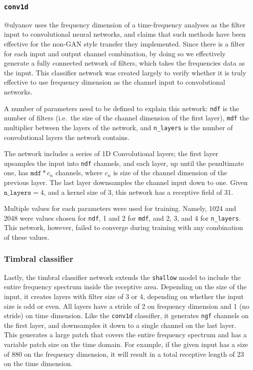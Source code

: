 \documentclass[12pt,a4paper,]{report}
\begin{document}
\hypertarget{conv1d}{%
\subsubsection{\texorpdfstring{\texttt{conv1d}}{conv1d}}\label{conv1d}}

@ulyanov uses the frequency dimension of a time-frequency analyses as
the filter input to convolutional neural networks, and claims that such
methods have been effective for the non-GAN style transfer they
implemented. Since there is a filter for each input and output channel
combination, by doing so we effectively generate a fully connected
network of filters, which takes the frequencies data as the input. This
classifier network was created largely to verify whether it is truly
effective to use frequency dimension as the channel input to
convolutional networks.

A number of parameters need to be defined to explain this network:
\texttt{ndf} is the number of filters (i.e.~the size of the channel
dimension of the first layer), \texttt{mdf} the multiplier between the
layers of the network, and \texttt{n\_layers} is the number of
convolutional layers the network contains.

The network includes a series of 1D Convolutional layers; the first
layer upsamples the input into \texttt{ndf} channels, and each layer, up
until the penultimate one, has \(\texttt{mdf} * c_n\) channels, where
\(c_n\) is size of the channel dimension of the previous layer. The last
layer downsamples the channel input down to one. Given
\(\texttt{n\_layers} = 4\), and a kernel size of 3, this network has a
receptive field of 31.

Multiple values for each parameters were used for training. Namely, 1024
and 2048 were values chosen for \texttt{ndf}, 1 and 2 for \texttt{mdf},
and 2, 3, and 4 for \texttt{n\_layers}. This network, however, failed to
converge during training with any combination of these values.

\hypertarget{timbral-classifier}{%
\subsubsection{Timbral classifier}\label{timbral-classifier}}

Lastly, the timbral classifier network extends the \texttt{shallow}
model to include the entire frequency spectrum inside the receptive
area. Depending on the size of the input, it creates layers with filter
size of 3 or 4, depending on whether the input size is odd or even. All
layers have a stride of 2 on frequency dimension and 1 (no stride) on
time dimension. Like the \texttt{conv1d} classifier, it generates
\texttt{ngf} channels on the first layer, and downsamples it down to a
single channel on the last layer. This generates a large patch that
covers the entire frequency spectrum and has a variable patch size on
the time domain. For example, if the given input has a size of 880 on
the frequency dimension, it will result in a total receptive length of
23 on the time dimension.
\end{document}
